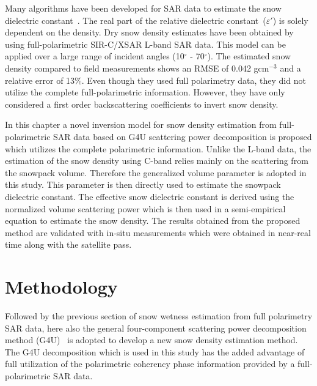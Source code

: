 Many algorithms have been developed for SAR data to estimate the snow dielectric constant~\citep{Shi93,Shi95,Singh2007_spie,niang2007new,singh2010snow,surendar2013improved,bhattacharya2014snow}. The real part of the relative dielectric constant~($\varepsilon{'}$) is solely dependent on the density. Dry snow density estimates have been obtained by~\citep{Shi2000} using full-polarimetric SIR-C/XSAR L-band SAR data. This model can be applied over a large range of incident angles (10$^\circ$ - 70$^\circ$). The estimated snow density compared to field measurements shows an RMSE of 0.042 gcm$^{-3}$ and a relative error of 13$\%$. Even though they used full polarimetry data, they did not utilize the complete full-polarimetric information. However, they have only considered a first order backscattering coefficients to invert snow density. 

In this chapter a novel inversion model for snow density estimation from full-polarimetric SAR data based on G4U scattering power decomposition is proposed which utilizes the complete polarimetric information. Unlike the L-band data, the estimation of the snow density using C-band relies mainly on the scattering from the snowpack volume. Therefore the generalized volume parameter is adopted in this study. This parameter is then directly used to estimate the snowpack dielectric constant. The effective snow dielectric constant is derived using the normalized volume scattering power which is then used in a semi-empirical equation to estimate the snow density. The results obtained from the proposed method are validated with in-situ measurements which were obtained in near-real time along with the satellite pass.

\section{Methodology}
\label{S:2}
Followed by the previous section of snow wetness estimation from full polarimetry SAR data, here also the general four-component scattering power decomposition method (G4U)~\citep{singh13} is adopted to develop a new snow density estimation method. The G4U decomposition which is used in this study has the added advantage of full utilization of the polarimetric coherency phase information provided by a full-polarimetric SAR data. 

